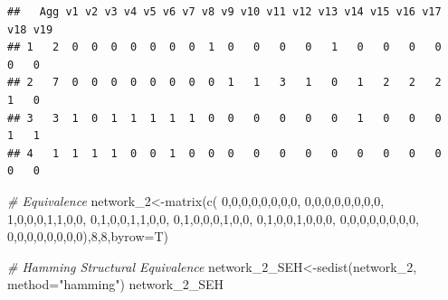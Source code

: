 \documentclass[
  notitlepage,
  onecolumn,
  openany]{book}
\newenvironment{Shaded}{\begin{snugshade}}{\end{snugshade}}
\newcommand{\AttributeTok}[1]{\textcolor[rgb]{0.77,0.63,0.00}{#1}}
\newcommand{\CommentTok}[1]{\textcolor[rgb]{0.56,0.35,0.01}{\textit{#1}}}
\newcommand{\DecValTok}[1]{\textcolor[rgb]{0.00,0.00,0.81}{#1}}
\newcommand{\FunctionTok}[1]{\textcolor[rgb]{0.00,0.00,0.00}{#1}}
\newcommand{\NormalTok}[1]{#1}
\newcommand{\OtherTok}[1]{\textcolor[rgb]{0.56,0.35,0.01}{#1}}
\newcommand{\StringTok}[1]{\textcolor[rgb]{0.31,0.60,0.02}{#1}}
\begin{document}
\begin{verbatim}
##   Agg v1 v2 v3 v4 v5 v6 v7 v8 v9 v10 v11 v12 v13 v14 v15 v16 v17 v18 v19
## 1   2  0  0  0  0  0  0  0  1  0   0   0   0   1   0   0   0   0   0   0
## 2   7  0  0  0  0  0  0  0  0  1   1   3   1   0   1   2   2   2   1   0
## 3   3  1  0  1  1  1  1  1  0  0   0   0   0   0   1   0   0   0   1   1
## 4   1  1  1  1  0  0  1  0  0  0   0   0   0   0   0   0   0   0   0   0
\end{verbatim}

\begin{Shaded}
\begin{Highlighting}[]
\CommentTok{\# Equivalence}
\NormalTok{network\_2}\OtherTok{\textless{}{-}}\FunctionTok{matrix}\NormalTok{(}\FunctionTok{c}\NormalTok{(}
  \DecValTok{0}\NormalTok{,}\DecValTok{0}\NormalTok{,}\DecValTok{0}\NormalTok{,}\DecValTok{0}\NormalTok{,}\DecValTok{0}\NormalTok{,}\DecValTok{0}\NormalTok{,}\DecValTok{0}\NormalTok{,}\DecValTok{0}\NormalTok{,}
  \DecValTok{0}\NormalTok{,}\DecValTok{0}\NormalTok{,}\DecValTok{0}\NormalTok{,}\DecValTok{0}\NormalTok{,}\DecValTok{0}\NormalTok{,}\DecValTok{0}\NormalTok{,}\DecValTok{0}\NormalTok{,}\DecValTok{0}\NormalTok{,}
  \DecValTok{1}\NormalTok{,}\DecValTok{0}\NormalTok{,}\DecValTok{0}\NormalTok{,}\DecValTok{0}\NormalTok{,}\DecValTok{1}\NormalTok{,}\DecValTok{1}\NormalTok{,}\DecValTok{0}\NormalTok{,}\DecValTok{0}\NormalTok{,}
  \DecValTok{0}\NormalTok{,}\DecValTok{1}\NormalTok{,}\DecValTok{0}\NormalTok{,}\DecValTok{0}\NormalTok{,}\DecValTok{1}\NormalTok{,}\DecValTok{1}\NormalTok{,}\DecValTok{0}\NormalTok{,}\DecValTok{0}\NormalTok{,}
  \DecValTok{0}\NormalTok{,}\DecValTok{1}\NormalTok{,}\DecValTok{0}\NormalTok{,}\DecValTok{0}\NormalTok{,}\DecValTok{0}\NormalTok{,}\DecValTok{1}\NormalTok{,}\DecValTok{0}\NormalTok{,}\DecValTok{0}\NormalTok{,}
  \DecValTok{0}\NormalTok{,}\DecValTok{1}\NormalTok{,}\DecValTok{0}\NormalTok{,}\DecValTok{0}\NormalTok{,}\DecValTok{1}\NormalTok{,}\DecValTok{0}\NormalTok{,}\DecValTok{0}\NormalTok{,}\DecValTok{0}\NormalTok{,}
  \DecValTok{0}\NormalTok{,}\DecValTok{0}\NormalTok{,}\DecValTok{0}\NormalTok{,}\DecValTok{0}\NormalTok{,}\DecValTok{0}\NormalTok{,}\DecValTok{0}\NormalTok{,}\DecValTok{0}\NormalTok{,}\DecValTok{0}\NormalTok{,}
  \DecValTok{0}\NormalTok{,}\DecValTok{0}\NormalTok{,}\DecValTok{0}\NormalTok{,}\DecValTok{0}\NormalTok{,}\DecValTok{0}\NormalTok{,}\DecValTok{0}\NormalTok{,}\DecValTok{0}\NormalTok{,}\DecValTok{0}\NormalTok{),}\DecValTok{8}\NormalTok{,}\DecValTok{8}\NormalTok{,}\AttributeTok{byrow=}\NormalTok{T)}

\CommentTok{\# Hamming Structural Equivalence}
\NormalTok{network\_2\_SEH}\OtherTok{\textless{}{-}}\FunctionTok{sedist}\NormalTok{(network\_2, }\AttributeTok{method=}\StringTok{"hamming"}\NormalTok{)}
\NormalTok{network\_2\_SEH}
\end{Highlighting}
\end{Shaded}
\end{document}
